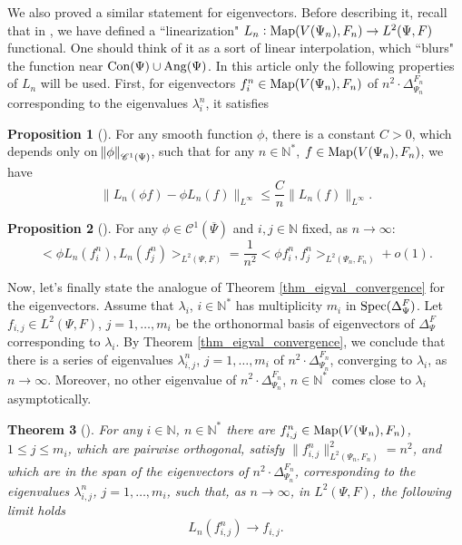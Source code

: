 \documentclass[12pt]{article}
\numberwithin{equation}{section}
\theoremstyle{theorem}
\newtheorem{thm}{Theorem}[section]
\theoremstyle{definition}
\newtheorem{prop}[thm]{Proposition}
\theoremstyle{remark}
\newcommand{\nat}{\mathbb{N}}
\newcommand{\spec}{{\rm{Spec}}}
\newcommand{\ccal}{\mathscr{C}}
\newcommand{\laplcomp}{\Delta}
\newcommand{\scal}[2]{\big< #1, #2 \big>}
\begin{document}
	We also proved a similar statement for eigenvectors.  Before describing it, recall that in \cite[\S 3.2]{FinFinDiffer}, we have defined a “linearization" $L_n : {\rm{Map}}(V(\Psi_n), F_n) \to L^2(\Psi, F)$ functional.
	One should think of it as a sort of linear interpolation, which “blurs" the function near ${\rm{Con}}(\Psi) \cup {\rm{Ang}}(\Psi)$.
	In this article only the following properties of $L_n$ will be used.
	First, for eigenvectors $f_i^{n} \in {\rm{Map}}(V(\Psi_n), F_n)$ of $n^2 \cdot \laplcomp_{\Psi_n}^{F_n}$ corresponding to the eigenvalues $\lambda_i^{n}$, it satisfies
	\begin{prop}[{\cite[\S 3.2]{FinFinDiffer}}]\label{prop_cor_red_zeta_conv_aux_3}
		For any smooth function $\phi$, there is a constant $C > 0$, which depends only on $\norm{\phi}_{\ccal^1(\Psi)}$, such that for any $n \in \nat^*$, $f \in {\rm{Map}}(V(\Psi_n), F_n)$, we have
		\begin{equation}\label{eq_cor_red_zeta_conv_aux_3}
			\big\| L_n(\phi f) - \phi  L_n(f) \big\|_{L^{\infty}} \leq  \frac{C}{n} \big\| L_n(f) \big\|_{L^{\infty}}.
		\end{equation}
	\end{prop}
	\begin{prop}[{\cite[Proposition 3.8]{FinFinDiffer}}]\label{prop_ln_appr_easy}
			For any $\phi \in \ccal^{1}(\overline{\Psi})$ and $i, j \in \nat$ fixed, as $n \to \infty$:
			\begin{equation}\label{eq_ln_eig_appr_easy}
				\scal{\phi L_n(f_i^{n}) }{L_n(f_j^{n}) }_{L^2(\Psi, F)} = \frac{1}{n^2} \scal{\phi f_i^{n} }{f_j^{n}}_{L^2(\Psi_n, F_n)} + o(1).
			\end{equation}
	\end{prop}
	Now, let's finally state the analogue of Theorem \ref{thm_eigval_convergence} for the eigenvectors.
	Assume that $\lambda_i$, $i \in \nat^*$ has multiplicity $m_i$ in $\spec(\laplcomp_{\Psi}^{F})$.
	Let $f_{i, j} \in L^2(\Psi, F)$, $j = 1, \ldots, m_i$ be the orthonormal basis of eigenvectors of $\laplcomp_{\Psi}^{F}$ corresponding to $\lambda_i$.
	By Theorem \ref{thm_eigval_convergence}, we conclude that there is a series of eigenvalues $\lambda_{i, j}^{n}$, $j = 1, \ldots, m_i$ of $n^2 \cdot\laplcomp_{\Psi_n}^{F_n}$, converging to $\lambda_i$, as $n \to \infty$. 
	Moreover, no other eigenvalue of $n^2 \cdot\laplcomp_{\Psi_n}^{F_n}$, $n \in \nat^*$ comes close to $\lambda_i$ asymptotically.
	\begin{thm}[{\cite[Theorem 1.3]{FinFinDiffer}}]\label{thm_eigvec_convergence}
		For any $i \in \nat$, $n \in \nat^*$ there are $f_{i, j}^{n} \in {\rm{Map}}(V(\Psi_n), F_n)$,$1 \leq j \leq m_i$, which are pairwise orthogonal, satisfy $\| f_{i, j}^{n} \|_{L^2(\Psi_n, F_n)}^{2} = n^2$, and which are in the span of the eigenvectors of $n^2 \cdot\laplcomp_{\Psi_n}^{F_n}$, corresponding to the eigenvalues $\lambda_{i, j}^{n}$, $j = 1, \ldots, m_i$,   such that, as $n \to \infty$, in $L^2(\Psi, F)$, the following limit holds 
		\begin{equation}\label{eq_eigvec_convergence}
			L_n(f_{i, j}^{n}) \to f_{i, j}.
		\end{equation}
	\end{thm}
\end{document}

